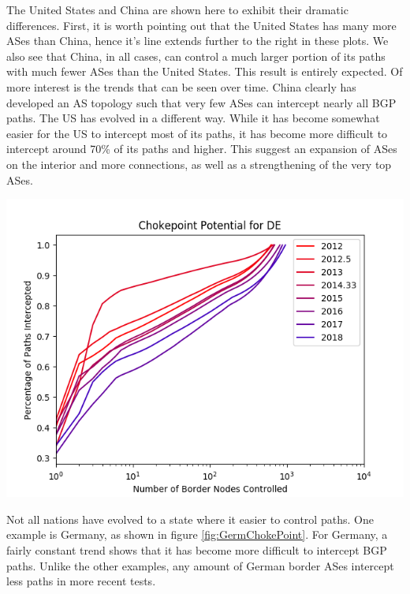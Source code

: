 \documentclass{article}
\newenvironment{Figure}
  {\par\medskip\noindent\minipage{\linewidth}}
  {\endminipage\par\medskip}
\begin{document}
\begin{multicols}{2}
\par
The United States and China are shown here to exhibit their dramatic differences. First, it is worth pointing out that the United States has many more ASes than China, hence
it's line extends further to the right in these plots. We also see that China, in all cases, can control a much larger portion of its paths with much fewer ASes than the
United States. This result is entirely expected. Of more interest is the trends that can be seen over time. China clearly has developed an AS topology such that very few
ASes can intercept nearly all BGP paths. The US has evolved in a different way. While it has become somewhat easier for the US to intercept most of its paths, it has become
more difficult to intercept around 70\% of its paths and higher. This suggest an expansion of ASes on the interior and more connections, as well as a strengthening of
the very top ASes.

\begin{Figure}
	\centering
	\includegraphics[width=\linewidth]{single_DE}
	\label{fig:GermChokePoint}
\end{Figure}

\par
Not all nations have evolved to a state where it easier to control paths. One example is Germany, as shown in figure \ref{fig:GermChokePoint}. For Germany, a fairly constant
trend shows that it has become more difficult to intercept BGP paths. Unlike the other examples, any amount of German border ASes intercept less paths in more recent tests.


\end{multicols}
\end{document}

